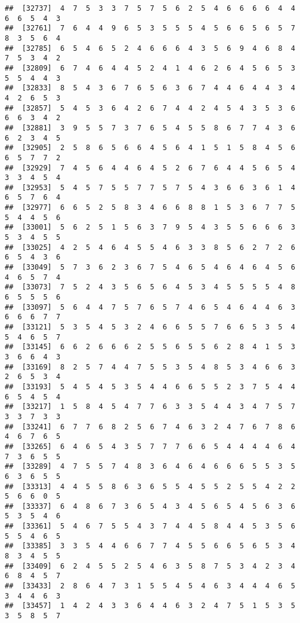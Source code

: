 \documentclass[
]{book}
\begin{document}
\begin{verbatim}
##  [32737]  4  7  5  3  3  7  5  7  5  6  2  5  4  6  6  6  6  4  4  6  6  5  4  3
##  [32761]  7  6  4  4  9  6  5  3  5  5  5  4  5  6  6  5  6  5  7  8  3  5  6  4
##  [32785]  6  5  4  6  5  2  4  6  6  6  4  3  5  6  9  4  6  8  4  7  5  3  4  2
##  [32809]  6  7  4  6  4  4  5  2  4  1  4  6  2  6  4  5  6  5  3  5  5  4  4  3
##  [32833]  8  5  4  3  6  7  6  5  6  3  6  7  4  4  6  4  4  3  4  4  2  6  5  3
##  [32857]  5  4  5  3  6  4  2  6  7  4  4  2  4  5  4  3  5  3  6  6  6  3  4  2
##  [32881]  3  9  5  5  7  3  7  6  5  4  5  5  8  6  7  7  4  3  6  6  2  3  4  5
##  [32905]  2  5  8  6  5  6  6  4  5  6  4  1  5  1  5  8  4  5  6  6  5  7  7  2
##  [32929]  7  4  5  6  4  4  6  4  5  2  6  7  6  4  4  5  6  5  4  3  3  4  5  4
##  [32953]  5  4  5  7  5  5  7  7  5  7  5  4  3  6  6  3  6  1  4  6  5  7  6  4
##  [32977]  6  6  5  2  5  8  3  4  6  6  8  8  1  5  3  6  7  7  5  5  4  4  5  6
##  [33001]  5  6  2  5  1  5  6  3  7  9  5  4  3  5  5  6  6  6  3  5  3  4  5  5
##  [33025]  4  2  5  4  6  4  5  5  4  6  3  3  8  5  6  2  7  2  6  6  5  4  3  6
##  [33049]  5  7  3  6  2  3  6  7  5  4  6  5  4  6  4  6  4  5  6  4  6  5  7  4
##  [33073]  7  5  2  4  3  5  6  5  6  4  5  3  4  5  5  5  5  4  8  6  5  5  5  6
##  [33097]  5  6  4  4  7  5  7  6  5  7  4  6  5  4  6  4  4  6  3  6  6  6  7  7
##  [33121]  5  3  5  4  5  3  2  4  6  6  5  5  7  6  6  5  3  5  4  5  4  6  5  7
##  [33145]  6  6  2  6  6  6  2  5  5  6  5  5  6  2  8  4  1  5  3  3  6  6  4  3
##  [33169]  8  2  5  7  4  4  7  5  5  3  5  4  8  5  3  4  6  6  3  2  6  5  3  4
##  [33193]  5  4  5  4  5  3  5  4  4  6  6  5  5  2  3  7  5  4  4  6  5  4  5  4
##  [33217]  1  5  8  4  5  4  7  7  6  3  3  5  4  4  3  4  7  5  7  3  3  7  3  3
##  [33241]  6  7  7  6  8  2  5  6  7  4  6  3  2  4  7  6  7  8  6  4  6  7  6  5
##  [33265]  6  4  6  5  4  3  5  7  7  7  6  6  5  4  4  4  4  6  4  7  3  6  5  5
##  [33289]  4  7  5  5  7  4  8  3  6  4  6  4  6  6  6  5  5  3  5  6  3  6  5  5
##  [33313]  4  4  5  5  8  6  3  6  5  5  4  5  5  2  5  5  4  2  2  5  6  6  0  5
##  [33337]  6  4  8  6  7  3  6  5  4  3  4  5  6  5  4  5  6  3  6  5  3  5  4  6
##  [33361]  5  4  6  7  5  5  4  3  7  4  4  5  8  4  4  5  3  5  6  5  5  4  6  5
##  [33385]  3  3  5  4  4  6  6  7  7  4  5  5  6  6  5  6  5  3  4  8  3  4  5  5
##  [33409]  6  2  4  5  5  2  5  4  6  3  5  8  7  5  3  4  2  3  4  6  8  4  5  7
##  [33433]  2  8  6  4  7  3  1  5  5  4  5  4  6  3  4  4  4  6  5  3  4  4  6  3
##  [33457]  1  4  2  4  3  3  6  4  4  6  3  2  4  7  5  1  5  3  5  3  5  8  5  7

\end{verbatim}
\end{document}
